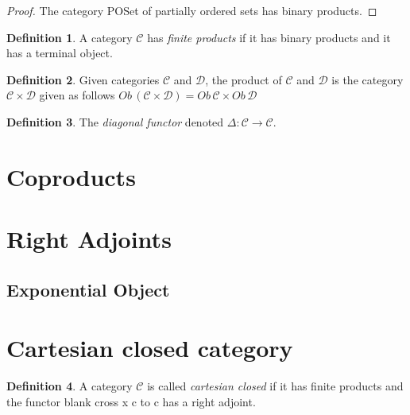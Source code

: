 \documentclass{article}
\theoremstyle{definition}
\newtheorem{definition}{Definition}[section]
\newcommand{\C}{\mathcal{C}}
\newcommand{\D}{\mathcal{D}}
\begin{document}
\begin{proof}
    The category POSet of partially ordered sets has binary products.
\end{proof}

\begin{definition}
    A category $\C$ has \textit{finite products} if
    it has binary products
    and it has a terminal object.
\end{definition}

\begin{definition}
    Given categories $\C$ and $\D$,
    the product of $\C$ and $\D$ is the category $\C \times \D$
    given as follows $Ob\,(\C \times \D) = Ob\,\C \times Ob\,\D$
\end{definition}

\begin{definition}
    The \textit{diagonal functor} denoted $\Delta : \C \rightarrow \C$.
\end{definition}


\section{Coproducts}

\section{Right Adjoints}
\subsection{Exponential Object}

\section{Cartesian closed category}

\begin{definition}
    A category $\C$ is called \textit{cartesian closed}
    if it has finite products
    and the functor %
    blank cross x c to c has a right adjoint.
\end{definition}
\end{document}
